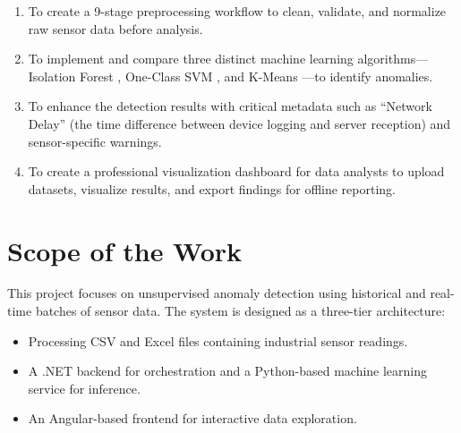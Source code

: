 \begin{enumerate}
    \item To create a 9-stage preprocessing workflow to clean, validate, and normalize raw sensor data before analysis.
    \item To implement and compare three distinct machine learning algorithms---Isolation Forest \cite{liu2008}, One-Class SVM \cite{scholkopf2001}, and K-Means \cite{jain2010}---to identify anomalies.
    \item To enhance the detection results with critical metadata such as ``Network Delay'' (the time difference between device logging and server reception) and sensor-specific warnings.
    \item To create a professional visualization dashboard for data analysts to upload datasets, visualize results, and export findings for offline reporting.
\end{enumerate}

\section{Scope of the Work}
This project focuses on unsupervised anomaly detection using historical and real-time batches of sensor data. The system is designed as a three-tier architecture:
\begin{itemize}
    \item Processing CSV and Excel files containing industrial sensor readings.
    \item A .NET backend for orchestration and a Python-based machine learning service for inference.
    \item An Angular-based frontend for interactive data exploration.
\end{itemize}
